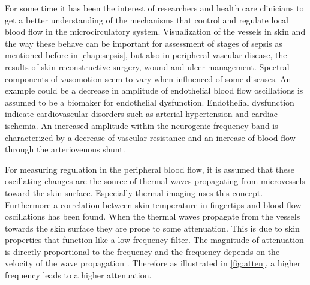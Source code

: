\label{freq}

For some time it has been the interest of researchers and health care clinicians to get a better understanding of the mechanisms that control and regulate local blood flow in the microcirculatory system\cite{sagaidachnyi2014,sagaidachnyi2017,geyer2004,liu2012}. 
Visualization of the vessels in skin and the way these behave can be important for assessment of stages of sepsis as mentioned before in \cref{chap:sepsis}, but also in peripheral vascular disease, the results of skin reconstructive surgery, wound and ulcer management.\cite{liu2012,kanta2014}
Spectral components of vasomotion seem to vary when influenced of some diseases. An example could be a decrease in amplitude of endothelial blood flow oscillations is assumed to be a biomaker for endothelial dysfunction. Endothelial dysfunction indicate cardiovascular disorders such as arterial hypertension and cardiac ischemia. An increased amplitude within the neurogenic frequency band is characterized by a decrease of vascular resistance and an increase of blood flow through the arteriovenous shunt.\cite{sagaidachnyi2017}

For measuring regulation in the peripheral blood flow, it is assumed that these oscillating changes are the source of thermal waves propagating from microvessels toward the skin surface. Especially thermal imaging uses this concept.\cite{sagaidachnyi2017}
Furthermore a correlation between skin temperature in fingertips and blood flow oscillations has been found\cite{sagaidachnyi2014}.
When the thermal waves propagate from the vessels towards the skin surface they are prone to some attenuation. This is due to skin properties that function like a low-frequency filter.\cite{podtaev2008}
The magnitude of attenuation is directly proportional to the frequency and the frequency depends on the velocity of the wave propagation \cite{sagaidachnyi2014}.
Therefore as illustrated in \cref{fig:atten}, a higher frequency leads to a higher attenuation.   

